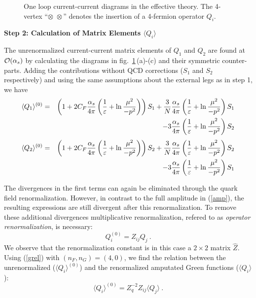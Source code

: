 \documentclass[12pt]{article}
\def\eps{\varepsilon}
\def\as{\alpha_s}
\newcommand{\ord}{{\cal O}}
\def\aspi{\frac{\as}{4\pi}}
\begin{document}
\begin{itemize}
\begin{itemize}
\begin{itemize}
\begin{figure}[hbt]
\vspace{0.10in}
\centerline{
\epsfysize=1.25in
}%
\vspace{0.08in}
\caption[]{One loop current-current  diagrams
in
the effective theory. The 4-vertex ``$\otimes\,\,\otimes$'' denotes the
insertion of a 4-fermion operator $Q_i$.
\label{L:15}}
\end{figure}

{\bf Step 2: Calculation of Matrix Elements $\langle Q_i\rangle$}

The unrenormalized current-current matrix elements
of $Q_1$ and $Q_2$ are found at $\ord(\as)$ by calculating 
the diagrams in  fig.~\ref{L:15}\,(a)-(c) and their symmetric counter-parts.
Adding the contributions without QCD corrections 
($S_1$ and $S_2$ respectively) and using
the same assumptions about the external legs as in step 1, 
we have
\begin{eqnarray}\label{q10}
\langle Q_1\rangle^{(0)} &= & 
\left(1+2C_F \aspi\left({1\over\eps}+\ln{\mu^2\over -p^2}
\right)\right)S_1+{3\over N}\aspi\left({1\over\eps}+\ln{\mu^2\over -p^2}
\right)S_1
\nonumber\\
& &-3\aspi\left({1\over\eps}+\ln{\mu^2\over -p^2}\right) S_2  
\end{eqnarray}
\begin{eqnarray}\label{q20}
\langle Q_2\rangle^{(0)} &=& 
\left(1+2C_F \aspi\left({1\over\eps}+\ln{\mu^2\over -p^2}
\right)\right)S_2+{3\over N}\aspi\left({1\over\eps}+\ln{\mu^2\over -p^2}
\right)S_2
\nonumber\\
& & -3\aspi\left({1\over\eps}+\ln{\mu^2\over -p^2}\right) S_1  
\end{eqnarray}

The divergences in the first terms can again be  eliminated through 
the quark field
renormalization. However, in contrast to the full amplitude
in (\ref{amp}), the
resulting expressions are still divergent after this renormalization.
To remove these additional divergences
multiplicative renormalization, refered to as {\it operator renormalization},
is necessary:
\begin{equation}
Q_i^{(0)} = Z_{ij} Q_j~.
\label{AL}
\end{equation}
We observe that the renormalization constant is in this case a $2\times 2$
matrix $\hat Z$.
Using (\ref{grel})  with $(n_F,n_G)=(4,0)$, we find 
the relation between the unrenormalized
($\langle Q_i\rangle^{(0)}$) and the renormalized amputated Green
functions ($\langle Q_i\rangle$):
\begin{equation}\label{q0zq}
\langle Q_i\rangle^{(0)}=Z^{-2}_q Z_{ij}\langle Q_j\rangle~.
\end{equation}


\end{itemize}
\end{itemize}
\end{itemize}
\end{document}
